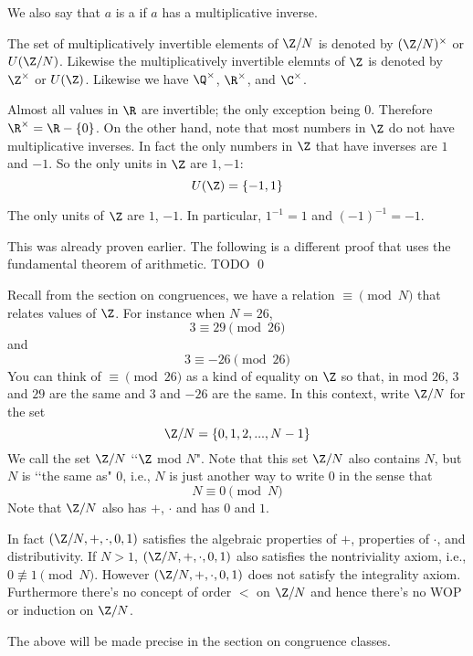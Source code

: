 \begin{defn}
We also say that $a$ is a  if $a$ has a multiplicative inverse.
\end{defn}

\begin{defn}
The set of multiplicatively invertible elements of $\Z/N$
is denoted by $(\Z/N)^\times$ or $U(\Z/N)$.
Likewise the multiplicatively invertible elemnts of $\Z$
is denoted by $\Z^\times$ or $U(\Z)$.
Likewise we have $\Q^\times$, $\R^\times$, and $\C^\times$.
\end{defn}

Almost all values in $\R$ are invertible;
the only exception being $0$.
Therefore $\R^\times = \R - \{0\}$.
On the other hand, note that most numbers in $\Z$ do not have multiplicative
inverses.
In fact the only numbers in $\Z$ that have inverses are $1$ and $-1$.
So the only units in $\Z$ are $1, -1$:
\[
U(\Z) = \{-1, 1\}
\]

\begin{prop}
  The only units of $\Z$ are $1$, $-1$.
  In particular, $1^{-1} = 1$ and $(-1)^{-1} = -1$.
\end{prop}
\proof
This was already proven earlier.
The following is a different proof that uses the fundamental theorem
of arithmetic.
TODO
\qed

Recall from the section on congruences, we have a relation $\equiv \pmod{N}$
that relates values of $\Z$.
For instance when $N = 26$,
\[
3 \equiv 29 \pmod{26}
\]
and
\[
3 \equiv -26 \pmod{26}
\]
You can think of $\equiv \pmod{26}$ as a kind of equality on $\Z$
so that, in mod $26$, $3$ and $29$ are the same and $3$ and $-26$
are the same.
In this context, write $\Z/N$ for the set
\[
\Z/N = \{0, 1, 2, ..., N - 1\}
\]
We call the set $\Z/N$ \lq\lq $\Z$ mod $N$".
Note that this set $\Z/N$ also contains $N$, but $N$ is \lq\lq the same as" $0$, i.e.,
$N$ is just another way to write $0$ in the sense that
\[
N \equiv 0 \pmod{N}
\]
Note that $\Z/N$ also has $+$, $\cdot$ and has $0$ and $1$.

In fact $(\Z/N, +, \cdot, 0, 1)$ satisfies the algebraic properties of $+$, 
properties of $\cdot$, and distributivity.
If $N > 1$, $(\Z/N, +, \cdot, 0, 1)$ also satisfies the nontriviality
axiom, i.e., $0 \not\equiv 1 \pmod{N}$.
However $(\Z/N, +, \cdot, 0, 1)$ does not satisfy the integrality
axiom. Furthermore there's no concept of order $<$ on $\Z/N$
and hence there's no WOP or induction on $\Z/N$.

The above will be made precise in the section on congruence classes.

